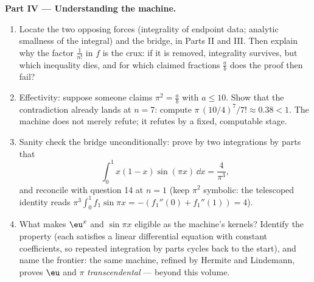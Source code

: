 \begin{problem}
\medskip
\noindent\textbf{Part IV --- Understanding the machine.}
\begin{enumerate}[resume]
  \item Locate the two opposing forces (integrality of endpoint
        data; analytic smallness of the integral) and the
        bridge, in Parts II and III. Then explain why the factor
        $\frac{1}{n!}$ in $f$ is the crux: if it is removed,
        integrality survives, but which inequality dies, and for
        which claimed fractions $\frac ab$ does the proof then
        fail?
  \item Effectivity: suppose someone claims $\pi^2 = \frac ab$
        with $a \leq 10$. Show that the contradiction already
        lands at $n = 7$: compute $\pi\,(10/4)^7/7! \approx
        0.38 < 1$. The machine does not merely refute; it
        refutes by a fixed, computable stage.
  \item Sanity check the bridge unconditionally: prove by two
        integrations by parts that
        \[
        \int_0^1 x(1 - x)\sin(\pi x)\,\dd x = \frac{4}{\pi^3},
        \]
        and reconcile with question 14 at $n = 1$ (keep
        $\pi^2$ symbolic: the telescoped identity reads $\pi^3
        \int_0^1 f_1 \sin \pi x = -(f_1''(0) + f_1''(1)) = 4$).
  \item What makes $\eu^x$ and $\sin \pi x$ eligible as the
        machine's kernels? Identify the property (each satisfies
        a linear differential equation with constant
        coefficients, so repeated integration by parts cycles
        back to the start), and name the frontier: the same
        machine, refined by Hermite and Lindemann, proves $\eu$
        and $\pi$ \emph{transcendental} --- beyond this volume.
\end{enumerate}


\end{problem}
